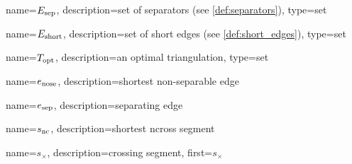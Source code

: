 {
  name={\ensuremath{E_\textnormal{sep}}},
  description={set of separators (see \cref{def:separators})},
  type={set}
}

{
  name={\ensuremath{E_\textnormal{short}}},
  description={set of short edges (see \cref{def:short_edges})},
  type={set}
}

{
  name={\ensuremath{T_\textnormal{opt}}},
  description={an optimal triangulation},
  type={set}
}

{
  name={\ensuremath{e_\textnormal{nose}}},
  description={shortest non-separable edge}
}

{
  name={\ensuremath{e_\textnormal{sep}}},
  description={separating edge}
}

{
  name={\ensuremath{s_\textnormal{nc}}},
  description={shortest \gls{ncross} segment}
}

{
  name={\ensuremath{s_{\times}}},
  description={crossing segment},
  first={\ensuremath{s_{\times}}}
}
